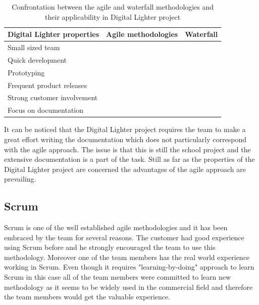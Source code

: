 \begin{table}[htb]
	\begin{center}
	\caption[Confrontation between the agile and waterfall methodologies]{Confrontation between the agile and waterfall methodologies and their applicability in Digital Lighter project}
	\label{tab:agile_vs_waterfall}
	\def\arraystretch{1.3}
		\begin{tabularx}{0.9\textwidth}{ X c c }
		\toprule[0.5mm]
		\textbf{Digital Lighter properties} & \textbf{Agile methodologies} & \textbf{Waterfall} \\
		\midrule
		Small sized team 								& \tick  & \tick 	\\
		Quick development				 				& \tick  & \cross 	\\
		Prototyping										& \tick  & \cross 	\\
		Frequent product releases 						& \tick  & \cross 	\\
		Strong customer involvement 					& \tick  & \cross 	\\
		Focus on documentation 							& \cross & \tick  	\\
		\bottomrule[0.5mm]
		\end{tabularx}
	\end{center}
\end{table}

It can be noticed that the Digital Lighter project requires the team to make a great effort writing the documentation which does not particularly correspond with the agile approach. The issue is that this is still the school project and the extensive documentation is a part of the task. Still as far as the properties of the Digital Lighter project are concerned the advantages of the agile approach are prevailing.

\subsection{Scrum} \label{subsec:scrum}
Scrum is one of the well established agile methodologies and it has been embraced by the team for several reasons. The customer had good experience using Scrum before and he strongly encouraged the team to use this methodology. Moreover one of the team members has the real world experience working in Scrum. Even though it requires "learning-by-doing" approach to learn Scrum in this case all of the  team members were committed to learn new methodology as it seems to be widely used in the commercial field and therefore the team members would get the valuable experience.

